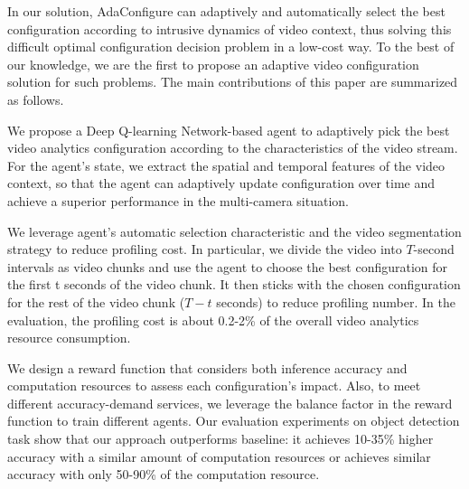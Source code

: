 In our solution, AdaConfigure can adaptively and automatically select the best configuration according to intrusive dynamics of video context, thus solving this difficult optimal configuration decision problem in a low-cost way. To the best of our knowledge, we are the first to propose an adaptive video configuration solution for such problems. 
The main contributions of this paper are summarized as follows. 

We propose a Deep Q-learning Network-based \cite{DQN} agent to adaptively pick the best video analytics configuration according to the characteristics of the video stream. For the agent's state, we extract the spatial and temporal features of the video context, so that the agent can adaptively update configuration over time and achieve a superior performance in the multi-camera situation. 

We leverage  agent's automatic selection characteristic and the video segmentation strategy to reduce profiling cost. In particular, we divide the video into $T$-second intervals as video chunks and use the agent to choose the best configuration for the first t seconds of the video chunk. It then sticks with the chosen configuration for the rest of the video chunk ($T-t$ seconds) to reduce profiling number. In the evaluation, the profiling cost is about 0.2-2\% of the overall video analytics resource consumption. 

We design a reward function that considers both inference accuracy and computation resources to assess each configuration's impact. Also, to meet different accuracy-demand services, we leverage the balance factor in the reward function to train different agents. Our evaluation experiments on object detection task show that our approach outperforms baseline: it achieves 10-35\% higher accuracy with a similar amount of computation resources or achieves similar accuracy with only 50-90\% of the computation resource.

